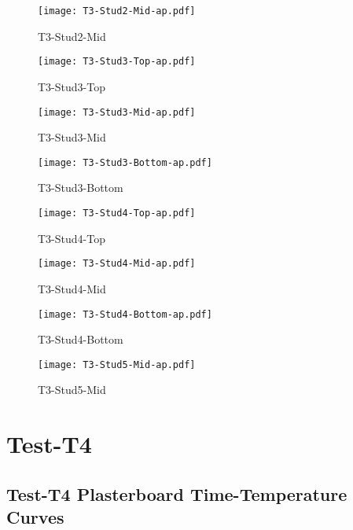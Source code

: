 \begin{figure}[htbp]
	\centering
			\texttt{[image: T3-Stud2-Mid-ap.pdf]}
			\caption*{T3-Stud2-Mid}
\end{figure}
\begin{figure}[htbp]
	\centering
			\texttt{[image: T3-Stud3-Top-ap.pdf]}
			\caption*{T3-Stud3-Top}
\end{figure}
\begin{figure}[htbp]
	\centering
			\texttt{[image: T3-Stud3-Mid-ap.pdf]}
			\caption*{T3-Stud3-Mid}
\end{figure}
\begin{figure}[htbp]
	\centering
			\texttt{[image: T3-Stud3-Bottom-ap.pdf]}
			\caption*{T3-Stud3-Bottom}
\end{figure}
\begin{figure}[htbp]
	\centering
			\texttt{[image: T3-Stud4-Top-ap.pdf]}
			\caption*{T3-Stud4-Top}
\end{figure}
\begin{figure}[htbp]
	\centering
			\texttt{[image: T3-Stud4-Mid-ap.pdf]}
			\caption*{T3-Stud4-Mid}
\end{figure}
\begin{figure}[htbp]
	\centering
			\texttt{[image: T3-Stud4-Bottom-ap.pdf]}
			\caption*{T3-Stud4-Bottom}
\end{figure}
\begin{figure}[htbp]
	\centering
			\texttt{[image: T3-Stud5-Mid-ap.pdf]}
			\caption*{T3-Stud5-Mid}
\end{figure}

\pagebreak

\section*{Test-T4}
\subsection*{Test-T4 Plasterboard Time-Temperature Curves}

